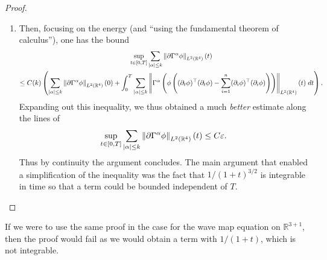 \documentclass{article}
\begin{document}
\begin{proof}
\begin{enumerate}[itemsep =-2pt,label = (\alph{*})]
\begin{equation*}
			\end{equation*} 
			But then, one has that on the right side of the inequality, 
			\begin{equation*}
				\sum_{|\beta|\leq \frac{k}{2}}\norm{\Gamma^{\beta}(\partial \Gamma^{\alpha}\phi)}_{L^{2}(\mathbb{R}^{4})}(t) \leq C\sum_{|\gamma|\leq k}\norm{\Gamma^{\gamma}\phi}_{L^{2}(\mathbb{R}^{4})}(t) \leq C\epsilon^{\frac{3}{4}}. 
			\end{equation*} 
			Thus, since this is true for all $t, x$, we have 
			\begin{equation*}
				\norm{(1 + t + |x|)^{\frac{3}{2}}\partial \Gamma^{\alpha}\phi}_{L^{\infty}(\mathbb{R}^{4})} \leq C\epsilon^{\frac{3}{4}}. 
			\end{equation*}
			Then summing over all multiindices $\alpha$ with $|\alpha| \leq \frac{k}{2}$, and incorporating an additional constant into $C$, we obtain the inequality above. Then since we have the bound 
			\begin{equation*}
				\sum_{1 \leq |\alpha| \leq \frac{k}{2} + 1}|\Gamma^{\alpha}\phi| \leq C(1 + t + |x|)\cdot \sum_{|\alpha|\leq \frac{k}{2}}|\partial \Gamma^{\alpha}\phi|, 
			\end{equation*} 
			so that 
			\begin{equation*}
				\sum_{1 \leq |\alpha| \leq \frac{k}{2} + 1}\norm{(1 + t + |x|)^{\frac{1}{2}} \Gamma^{\alpha}\phi}_{L^{\infty}(\mathbb{R}^{4})} \leq C\epsilon^{\frac{3}{4}}. 
			\end{equation*}
		\item Then, focusing on the energy (and ``using the fundamental theorem of calculus''), one has the bound 
		\begin{multline*}
			\sup_{t \in [0,T]}\sum_{|\alpha| \leq k}\left\Vert \partial \Gamma^{\alpha}\phi \right\Vert_{L^{2}(\mathbb{R}^{4})}(t) \\
			\leq 
			C(k)\left(\sum_{|\alpha|\leq k}\left\Vert \partial \Gamma^{\alpha}\phi \right\Vert_{L^{2}(\mathbb{R}^{4})}(0) + \int_{0}^{T}\sum_{|\alpha|\leq k}\left\Vert \Gamma^{\alpha}\left(\phi\left((\partial_{t}\phi)^{\top}(\partial_{t}\phi) - \sum_{i = 1}^{n}(\partial_{i}\phi)^{\top}(\partial_{i}\phi)\right)\right) \right\Vert_{L^{2}(\mathbb{R}^{4})}(t)\;dt\right). 
		\end{multline*} 
		Expanding out this inequality, we thus obtained a much \textit{better} estimate along the lines of 
		\begin{equation*}
			\sup_{t \in [0,T]}\sum_{|\alpha| \leq k}\left\Vert \partial \Gamma^{\alpha}\phi \right\Vert_{L^{2}(\mathbb{R}^{4})}(t) \leq C\varepsilon. 
		\end{equation*} 
		Thus by continuity the argument concludes. The main argument that enabled a simplification of the inequality was the fact that $1/(1 + t)^{3/2}$ is integrable in time so that a term could be bounded independent of $T$. 
	\end{enumerate}
\end{proof} 
If we were to use the same proof in the case for the wave map equation on $\mathbb{R}^{3 + 1}$, then the proof would fail as we would obtain a term with $1/(1 + t)$, which is not integrable. 
\end{document}
